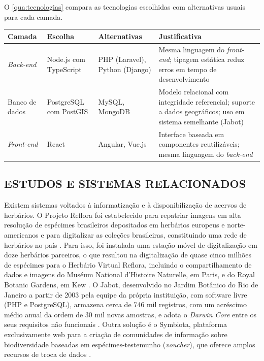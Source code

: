 \documentclass[
    12pt,        %
    openany,     %
    oneside,     %
    a4paper,     %
    english,     %
    french,      %
    spanish,     %
    brazil,      %
    article      %
]{abntex2}
\begin{document}
O \autoref{qua:tecnologias} compara as tecnologias escolhidas com alternativas usuais para cada camada.

\begin{quadro}[H]
    \centering
    \caption{Tecnologias escolhidas e alternativas consideradas}
    \label{qua:tecnologias}
    \small
    \begin{tabularx}{\textwidth}{|p{2.2cm}|p{2.8cm}|p{3cm}|X|}
        \hline
        \textbf{Camada} & \textbf{Escolha} & \textbf{Alternativas} & \textbf{Justificativa} \\
        \hline
        \textit{Back-end} & Node.js com TypeScript & PHP (Laravel), Python (Django) & Mesma linguagem do \textit{front-end}; tipagem estática reduz erros em tempo de desenvolvimento \\ \hline
        Banco de dados & PostgreSQL com PostGIS & MySQL, MongoDB & Modelo relacional com integridade referencial; suporte a dados geográficos; uso em sistema semelhante (Jabot) \\ \hline
        \textit{Front-end} & React & Angular, Vue.js & Interface baseada em componentes reutilizáveis; mesma linguagem do \textit{back-end} \\ \hline
    \end{tabularx}
\end{quadro}

\subsection{ESTUDOS E SISTEMAS RELACIONADOS}
\label{subsec:estudos-relacionados}

Existem sistemas voltados à informatização e à disponibilização de acervos de herbários. O Projeto Reflora foi estabelecido para repatriar imagens em alta resolução de espécimes brasileiros depositados em herbários europeus e norte-americanos e para digitalizar as coleções brasileiras, constituindo uma rede de herbários no país \cite{gasper2021digitalizacao}. Para isso, foi instalada uma estação móvel de digitalização em doze herbários parceiros, o que resultou na digitalização de quase cinco milhões de espécimes para o Herbário Virtual Reflora, incluindo o compartilhamento de dados e imagens do Muséum National d'Histoire Naturelle, em Paris, e do Royal Botanic Gardens, em Kew \cite{paton2026digitisation}. O Jabot, desenvolvido no Jardim Botânico do Rio de Janeiro a partir de 2003 pela equipe da própria instituição, com software livre (PHP e PostgreSQL), armazena cerca de 746 mil registros, com um acréscimo médio anual da ordem de 30 mil novas amostras, e adota o \textit{Darwin Core} entre os seus requisitos não funcionais \cite{silva2017jabot}. Outra solução é o Symbiota, plataforma exclusivamente web para a criação de comunidades de informação sobre biodiversidade baseadas em espécimes-testemunho (\textit{voucher}), que oferece amplos recursos de troca de dados \cite{gries2014symbiota}.
\end{document}
